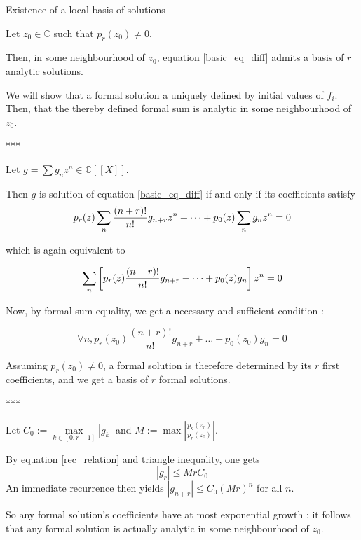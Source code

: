 \documentclass[../main.tex]{subfiles}
\begin{document}
\begin{thm}{Existence of a local basis of solutions}
	
	Let $z_0 \in \mathbb{C}$ such that $p_r (z_0) \neq 0$.
	
	Then, in some neighbourhood of $z_0$, equation \ref{basic_eq_diff}
	admits a basis of $r$ analytic solutions.
	
	\tcblower
	
	We will show that a formal solution a uniquely defined by initial values of $f_i$. Then, that the thereby defined formal sum is analytic in some neighbourhood of $z_0$.
	
	\begin{center}
		***
	\end{center}

	Let $g = \sum g_n z^n \in \mathbb{C}[[X]]$.
	
	Then $g$ is solution of equation \ref{basic_eq_diff} if and only if its coefficients satisfy
	\begin{equation*}
	p_r(z) \sum\limits_{n} \frac{(n + r)!}{n!} g_{n + r} z^n + \dots + p_0(z) \sum\limits_{n} g_n z^n = 0
	\end{equation*}
	
	which is again equivalent to
	
	\begin{equation*}
	\sum\limits_{n} \left[ p_r(z) \frac{(n + r)!}{n!} g_{n + r} + \dots + p_0(z) g_n \right] z^n = 0
	\end{equation*}
	
	Now, by formal sum equality, we get a necessary and sufficient condition :
	
	\begin{equation}\label{rec_relation}
		\forall n, p_r(z_0) \frac{(n + r)!}{n!} g_{n + r} + \dots + p_0(z_0) g_n = 0
	\end{equation}
	
	Assuming $p_r(z_0) \neq 0$, a formal solution is therefore determined by its $r$ first coefficients, and we get a basis of $r$ formal solutions.
	
	\begin{center}
		***
	\end{center}
	
	Let $C_0 := \max\limits_{k \in [0, r - 1]} |g_k|$ and $M := \max \left| \frac{p_k(z_0)}{p_r(z_0)} \right|$.

	By equation \ref{rec_relation} and triangle inequality, one gets
	\begin{equation*}
		|g_r| \leq MrC_0
	\end{equation*}
	An immediate recurrence then yields $|g_{n + r}| \leq C_0 {(Mr)}^n$ for all $n$.
	
	So any formal solution's coefficients have at most exponential growth ; it follows that any formal solution is actually analytic in some neighbourhood of $z_0$.
\end{thm}
\end{document}
